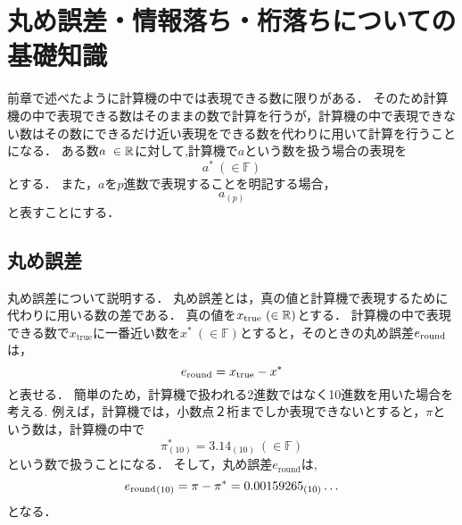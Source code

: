 \chapter{丸め誤差・情報落ち・桁落ちについての基礎知識}
前章で述べたように計算機の中では表現できる数に限りがある．
そのため計算機の中で表現できる数はそのままの数で計算を行うが，計算機の中で表現できない数はその数にできるだけ近い表現をできる数を代わりに用いて計算を行うことになる．
ある数$a\ \in \mathbb{R}$に対して,計算機で$a$という数を扱う場合の表現を
\begin{equation*}    
    a^{\ast} \ (\in \mathbb{F})
\end{equation*}
とする．
また，$a$を$p$進数で表現することを明記する場合，
\begin{equation*}
    a_{(p)}
\end{equation*}
と表すことにする．
\label{chap:基礎知識2}
\section{丸め誤差}
丸め誤差について説明する．
丸め誤差とは，真の値と計算機で表現するために代わりに用いる数の差である．
真の値を$x_{\mathrm{true}} \ (\in \mathbb{R})$とする．
計算機の中で表現できる数で$x_{\mathrm{true}}$に一番近い数を$x^{\ast} \ (\in \mathbb{F})$とすると，そのときの丸め誤差$e_{\mathrm{round}}$は，
\begin{equation*}
    e_{\mathrm{round}} = x_{\mathrm{true}} - x^{\ast}
\end{equation*}
と表せる．
簡単のため，計算機で扱われる2進数ではなく10進数を用いた場合を考える.
例えば，計算機では，小数点２桁までしか表現できないとすると，$\pi$という数は，計算機の中で
\begin{equation*}
    \pi^{\ast}_{(10)} = 3.14_{(10)} \ (\in \mathbb{F})
\end{equation*}
という数で扱うことになる．
そして，丸め誤差$e_{\mathrm{round}}$は,
\begin{equation*}
    {e_{\mathrm{round}}}_{(10)} = \pi - \pi^{\ast} = {0.00159265_{(10)}\dots}
\end{equation*}
となる．


